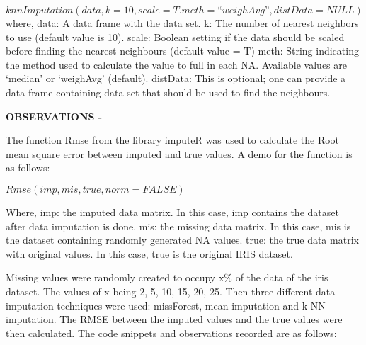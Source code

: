 \documentclass{article}
\begin{document}
	$knnImputation(data, k = 10, scale = T. meth = “weighAvg”, distData = NULL)$\newline\newline
	where,\newline
	data: A data frame with the data set.\newline
	k: The number of nearest neighbors to use (default value is 10).\newline
	scale: Boolean setting if the data should be scaled before finding the nearest neighbours (default value = T)\newline
	meth: String indicating the method used to calculate the value to full in each NA. Available values are ‘median’ or ‘weighAvg’ (default).\newline
	distData: This is optional; one can provide a data frame containing data set that should be used to find the neighbours.\newline\newline\newline
	
	\textbf{OBSERVATIONS -}\newline\newline
	
	
	The function Rmse from the library imputeR was used to calculate the Root mean square error between imputed and true values. A demo for the function is as follows:\newline
	
	$Rmse(imp, mis, true, norm = FALSE)$\newline
	
Where,\newline\newline
   imp: the imputed data matrix. In this case, imp contains the dataset after data imputation is done.\newline
   mis: the missing data matrix. In this case, mis is the dataset containing randomly generated NA values.\newline
   true: the true data matrix with original values. In this case, true is the original IRIS dataset.\newline\newline
   
   Missing values were randomly created to occupy x\% of the data of the iris dataset. The values of x being 2, 5, 10, 15, 20, 25. Then three different data imputation techniques were used: missForest, mean imputation and k-NN imputation. The RMSE between the imputed values and the true values were then calculated. The code snippets and observations recorded are as follows:\newline
   
\end{document}
